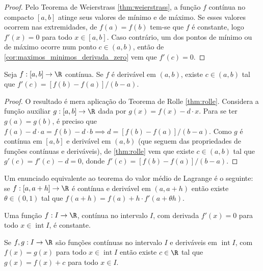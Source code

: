 \documentclass{article}
\begin{document}
\begin{proof}
    Pelo Teorema de Weierstrass \eqref{thm:weierstrass}, a função \(f\) contínua no compacto \([a,b]\) atinge seus valores de mínimo e de máximo. Se esses valores ocorrem nas extremidades, de \(f(a)=f(b)\) tem-se que \(f\) é constante, logo \(f'(x)=0\) para todo \(x \in [a,b]\). Caso contrário, um dos pontos de mínimo ou de máximo ocorre num ponto \(c \in (a,b)\), então de \eqref{cor:maximos_minimos_derivada_zero} vem que \(f'(c)=0\).
\end{proof}

\begin{thm}  \label{thm:tvm}
    Seja \(f: [a,b] \to \R\) contínua. Se \(f\) é derivável em \((a,b)\), existe \(c \in (a,b)\) tal que \(f'(c) = [f(b)-f(a)]/(b-a)\).
\end{thm}

\begin{proof}
    O resultado é mera aplicação do Teorema de Rolle \eqref{thm:rolle}. Considera a função auxiliar \(g: [a,b] \to \R\) dada por \(g(x) = f(x) - d\cdot x\). Para se ter \(g(a) = g(b)\), é preciso que \(f(a)-d\cdot a = f(b)-d\cdot b \implies d = [f(b)-f(a)]/(b-a)\). Como \(g\) é contínua em \([a,b]\) e derivável em \((a,b)\) (que seguem das propriedades de funções contínuas e deriváveis), de \eqref{thm:rolle} vem que existe \(c \in (a,b)\) tal que \(g'(c) = f'(c) - d = 0\), donde \(f'(c) = [f(b)-f(a)]/(b-a)\).
\end{proof}

\begin{rem}
    Um enunciado equivalente ao teorema do valor médio de Lagrange é o seguinte: se \(f: [a,a+h] \to \R\) é contínua e derivável em \((a,a+h)\) então existe \(\theta \in (0,1)\) tal que \(f(a+h) = f(a) + h \cdot f'(a + \theta h)\).
\end{rem}

\begin{cor}
    Uma função \(f: I \to \R\), contínua no intervalo \(I\), com derivada \(f'(x)=0\) para todo \(x \in \operatorname{int} I\), é constante.
\end{cor}

\begin{cor}
    Se \(f, g: I \to \R\) são funções contínuas no intervalo \(I\) e deriváveis em \(\operatorname{int} I\), com \(f(x) = g(x)\) para todo \(x \in \operatorname{int} I\) então existe \(c \in \R\) tal que \(g(x) = f(x) + c\) para todo \(x \in I\).
\end{cor}
\end{document}

